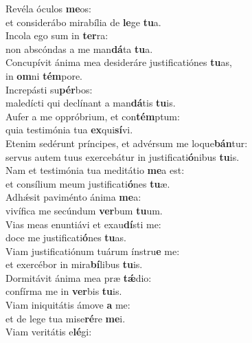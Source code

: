 \evenverse Revéla óculos \textbf{me}os:~\*\\
\evenverse et considerábo mirabília de \textbf{le}ge \textbf{tu}a.\\
\oddverse Incola ego sum in \textbf{ter}ra:~\*\\
\oddverse non abscóndas a me man\textbf{dá}ta \textbf{tu}a.\\
\evenverse Concupívit ánima mea desideráre justificatiónes \textbf{tu}as,~\*\\
\evenverse in \textbf{om}ni \textbf{tém}pore.\\
\oddverse Increpásti su\textbf{pér}bos:~\*\\
\oddverse maledícti qui declínant a man\textbf{dá}tis \textbf{tu}is.\\
\evenverse Aufer a me oppróbrium, et con\textbf{tém}ptum:~\*\\
\evenverse quia testimónia tua \textbf{ex}qui\textbf{sí}vi.\\
\oddverse Etenim sedérunt príncipes, et advérsum me loque\textbf{bán}tur:~\*\\
\oddverse servus autem tuus exercebátur in justificati\textbf{ó}nibus \textbf{tu}is.\\
\evenverse Nam et testimónia tua meditátio \textbf{me}a est:~\*\\
\evenverse et consílium meum justificati\textbf{ó}nes \textbf{tu}æ.\\
\oddverse Adhǽsit paviménto ánima \textbf{me}a:~\*\\
\oddverse vivífica me secúndum \textbf{ver}bum \textbf{tu}um.\\
\evenverse Vias meas enuntiávi et exau\textbf{dí}sti me:~\*\\
\evenverse doce me justificati\textbf{ó}nes \textbf{tu}as.\\
\oddverse Viam justificatiónum tuárum ínstru\textbf{e} me:~\*\\
\oddverse et exercébor in mira\textbf{bí}libus \textbf{tu}is.\\
\evenverse Dormitávit ánima mea præ \textbf{tǽ}dio:~\*\\
\evenverse confírma me in \textbf{ver}bis \textbf{tu}is.\\
\oddverse Viam iniquitátis ámove \textbf{a} me:~\*\\
\oddverse et de lege tua mise\textbf{ré}re \textbf{me}i.\\
\evenverse Viam veritátis e\textbf{lé}gi:~\*\\
